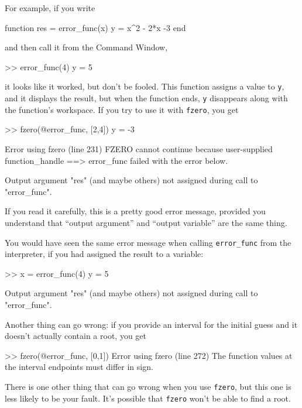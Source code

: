 For example, if you
write

\begin{code}
function res = error_func(x)
    y = x^2 - 2*x -3
end
\end{code}
and then call it from the Command Window,
\begin{code}
>> error_func(4)
y = 5
\end{code}
it looks like it worked, but don't be fooled.  This function assigns
a value to \lstinline{y}, and it displays the result, but when the function
ends, \lstinline{y} disappears along with the function's workspace.
If you try to use it with \lstinline{fzero}, you get

\begin{code}
>> fzero(@error_func, [2,4])
y = -3

Error using fzero (line 231)
FZERO cannot continue because user-supplied function_handle ==>
error_func failed with the error below.

Output argument "res" (and maybe others) not assigned during call
to "error_func".
\end{code}

If you read it carefully, this is a pretty good error message,
provided you understand that ``output argument'' and ``output variable'' are the same thing.


You would have seen the same error message when calling \lstinline{error_func} from the interpreter, if you had assigned the result to a variable:

\begin{code}
>> x = error_func(4)
y = 5

Output argument "res" (and maybe others) not assigned during
call to "error_func".
\end{code}

Another thing can go wrong: if you provide an interval for the
initial guess and it doesn't actually contain a root, you get

\begin{code}
>> fzero(@error_func, [0,1])
Error using fzero (line 272)
The function values at the interval endpoints must differ in sign.
\end{code}


There is one other thing that can go wrong when you use \lstinline{fzero}, but
this one is less likely to be your fault.  It's possible that \lstinline{fzero}
won't be able to find a root.

